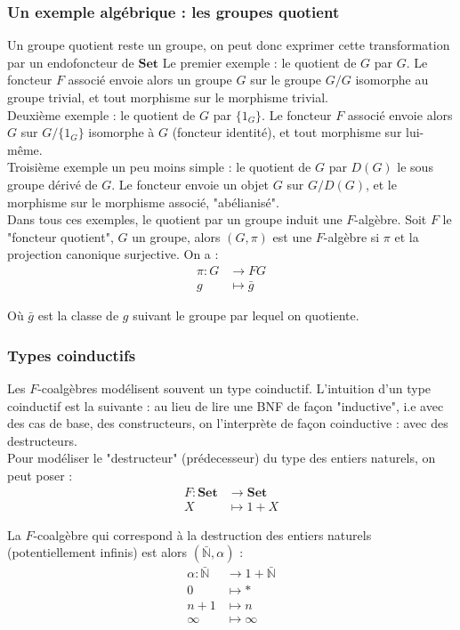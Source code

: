 \documentclass{article}
\newcommand{\N}{\mathbb{N}}
\begin{document}
\subsubsection{Un exemple algébrique : les groupes quotient}

Un groupe quotient reste un groupe, on peut donc exprimer cette transformation par un endofoncteur de $\mathbf{Set}$ 
Le premier exemple : le quotient de $G$ par $G$. Le foncteur $F$ associé envoie alors un groupe $G$ sur le groupe $G/G$ isomorphe au groupe trivial, et tout morphisme sur le morphisme trivial. \\ 
Deuxième exemple : le quotient de $G$ par $\{1_G\}$. Le foncteur $F$ associé envoie alors $G$ sur $G/\{ 1_G\}$ isomorphe à $G$ (foncteur identité), et tout morphisme sur lui-même. \\ 
Troisième exemple un peu moins simple : le quotient de $G$ par $D(G)$ le sous groupe dérivé de $G$. Le foncteur envoie un objet $G$ sur $G/D(G)$, et le morphisme sur le morphisme associé, "abélianisé". \\ 
Dans tous ces exemples, le quotient par un groupe induit une $F$-algèbre. Soit $F$ le "foncteur quotient", $G$ un groupe, alors $(G, \pi)$ est une $F$-algèbre  si $\pi$ et la projection canonique surjective. On a :  
\begin{align*}
    \pi : G & \rightarrow  FG\\
          g & \mapsto \bar{g}
\end{align*}

Où $\bar{g}$ est la classe de $g$ suivant le groupe par lequel on quotiente. 

\subsubsection{Types coinductifs}
Les $F$-coalgèbres  modélisent  souvent un type coinductif. L'intuition d'un type coinductif est la suivante : au lieu de lire une BNF de façon "inductive", i.e avec des cas de base, des constructeurs, on l'interprète de façon coinductive : avec des destructeurs.  \\

Pour modéliser le "destructeur" (prédecesseur) du type des entiers naturels, on peut poser : 
\begin{align*}
    F : \mathbf{Set} & \rightarrow \mathbf{Set} \\ 
        X & \mapsto 1 + X
\end{align*}

La $F$-coalgèbre qui correspond à la destruction des entiers naturels (potentiellement infinis) est alors $(\bar{\N}, \alpha)$ : 
\begin{align*}
    \alpha : \bar{\N} &\rightarrow 1 + \bar{\N} \\ 
            0 &\mapsto * \\ 
            n+1 & \mapsto n \\
            \infty & \mapsto \infty
\end{align*}
\end{document}
